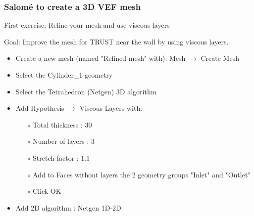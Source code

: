 \documentclass[10pt]{beamer}
\begin{document}
\begin{frame}
\frametitle{Salom\'e to create a 3D VEF mesh}
\begin{block}{First exercise: Refine your mesh and use viscous layers}

Goal: Improve the mesh for TRUST near the wall by using viscous layers.

\begin{itemize}
\item Create a new mesh (named "Refined mesh" with): Mesh $\rightarrow$ Create Mesh

\item Select the Cylinder\_1 geometry

\item Select the Tetrahedron (Netgen) 3D algorithm

\item Add Hypothesis $\rightarrow$ Viscous Layers with:
    \begin{itemize}
    \item [$\circ$] Total thickness : 30
    \item [$\circ$] Number of layers : 3
    \item [$\circ$] Stretch factor : 1.1
    \item [$\circ$] Add to Faces without layers the 2 geometry groups "Inlet" and "Outlet"
    \item [$\circ$] Click OK
    \end{itemize}

\item Add 2D algorithm : Netgen 1D-2D
\end{itemize}

\end{block}
\end{frame}
\end{document}

